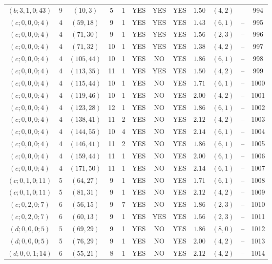 \begin{longtable}{|c|c|c|c|c|c|c|c|c|c|c|c|}
$(b;3,1,0;43)$ & 9 & $(10,3)$ & 5 & 1 & YES & YES & YES & $1.50$ & $(4,2)$ & -- & 994\\
$(c;0,0,0;4)$ & 4 & $(59,18)$ & 9 & 1 & YES & YES & YES & $1.43$ & $(6,1)$ & -- & 995\\
$(c;0,0,0;4)$ & 4 & $(71,30)$ & 9 & 1 & YES & YES & YES & $1.56$ & $(2,3)$ & -- & 996\\
$(c;0,0,0;4)$ & 4 & $(71,32)$ & 10 & 1 & YES & YES & YES & $1.38$ & $(4,2)$ & -- & 997\\
$(c;0,0,0;4)$ & 4 & $(105,44)$ & 10 & 1 & YES & NO & YES & $1.86$ & $(6,1)$ & -- & 998\\
$(c;0,0,0;4)$ & 4 & $(113,35)$ & 11 & 1 & YES & YES & YES & $1.50$ & $(4,2)$ & -- & 999\\
$(c;0,0,0;4)$ & 4 & $(115,44)$ & 10 & 1 & YES & NO & YES & $1.71$ & $(6,1)$ & -- & 1000\\
$(c;0,0,0;4)$ & 4 & $(119,46)$ & 10 & 1 & YES & NO & YES & $2.00$ & $(4,2)$ & -- & 1001\\
$(c;0,0,0;4)$ & 4 & $(123,28)$ & 12 & 1 & YES & NO & YES & $1.86$ & $(6,1)$ & -- & 1002\\
$(c;0,0,0;4)$ & 4 & $(138,41)$ & 11 & 2 & YES & NO & YES & $2.12$ & $(4,2)$ & -- & 1003\\
$(c;0,0,0;4)$ & 4 & $(144,55)$ & 10 & 4 & YES & NO & YES & $2.14$ & $(6,1)$ & -- & 1004\\
$(c;0,0,0;4)$ & 4 & $(146,41)$ & 11 & 2 & YES & NO & YES & $1.86$ & $(6,1)$ & -- & 1005\\
$(c;0,0,0;4)$ & 4 & $(159,44)$ & 11 & 1 & YES & NO & YES & $2.00$ & $(6,1)$ & -- & 1006\\
$(c;0,0,0;4)$ & 4 & $(171,50)$ & 11 & 1 & YES & NO & YES & $2.14$ & $(6,1)$ & -- & 1007\\
$(c;0,1,0;11)$ & 5 & $(64,27)$ & 9 & 1 & YES & NO & YES & $1.71$ & $(6,1)$ & -- & 1008\\
$(c;0,1,0;11)$ & 5 & $(81,31)$ & 9 & 1 & YES & NO & YES & $2.12$ & $(4,2)$ & -- & 1009\\
$(c;0,2,0;7)$ & 6 & $(56,15)$ & 9 & 7 & YES & NO & YES & $1.86$ & $(2,3)$ & -- & 1010\\
$(c;0,2,0;7)$ & 6 & $(60,13)$ & 9 & 1 & YES & YES & YES & $1.56$ & $(2,3)$ & -- & 1011\\
$(d;0,0,0;5)$ & 5 & $(69,29)$ & 9 & 1 & YES & NO & YES & $1.86$ & $(8,0)$ & -- & 1012\\
$(d;0,0,0;5)$ & 5 & $(76,29)$ & 9 & 1 & YES & NO & YES & $2.00$ & $(4,2)$ & -- & 1013\\
$(d;0,0,1;14)$ & 6 & $(55,21)$ & 8 & 1 & YES & NO & YES & $2.12$ & $(4,2)$ & -- & 1014\\

\end{longtable}
